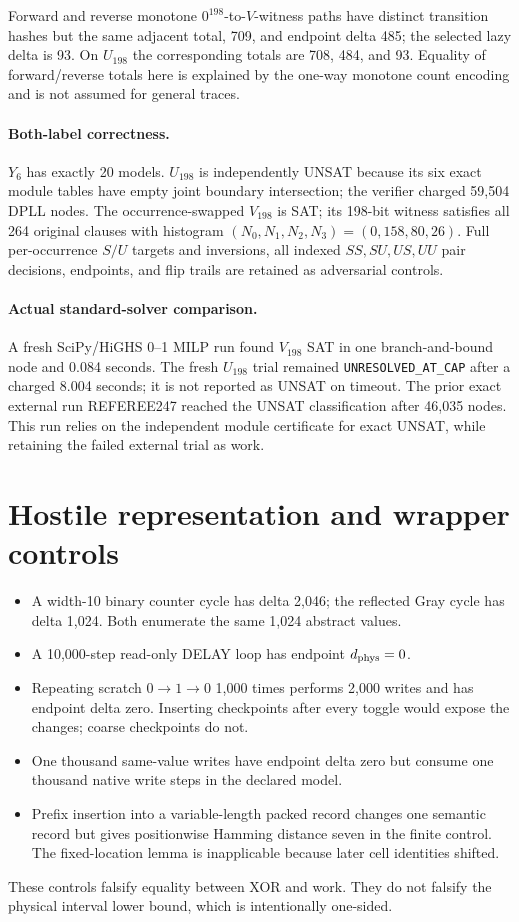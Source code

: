 \documentclass[11pt]{article}
\begin{document}
Forward and reverse monotone $0^{198}$-to-$V$-witness paths have distinct
transition hashes but the same adjacent total, 709, and endpoint delta 485;
the selected lazy delta is 93.  On $U_{198}$ the corresponding totals are 708,
484, and 93.  Equality of forward/reverse totals here is explained by the
one-way monotone count encoding and is not assumed for general traces.

\paragraph{Both-label correctness.}
$Y_6$ has exactly 20 models.  $U_{198}$ is independently UNSAT because its
six exact module tables have empty joint boundary intersection; the verifier
charged 59,504 DPLL nodes.  The occurrence-swapped $V_{198}$ is SAT; its
198-bit witness satisfies all 264 original clauses with histogram
$(N_0,N_1,N_2,N_3)=(0,158,80,26)$.  Full per-occurrence $S/U$ targets and
inversions, all indexed $SS,SU,US,UU$ pair decisions, endpoints, and flip trails
are retained as adversarial controls.

\paragraph{Actual standard-solver comparison.}
A fresh SciPy/HiGHS 0--1 MILP run found $V_{198}$ SAT in one branch-and-bound
node and 0.084 seconds.  The fresh $U_{198}$ trial remained
\texttt{UNRESOLVED\_AT\_CAP} after a charged 8.004 seconds; it is not reported
as UNSAT on timeout.  The prior exact external run REFEREE247 reached the UNSAT
classification after 46,035 nodes.  This run relies on the independent module
certificate for exact UNSAT, while retaining the failed external trial as work.

\section{Hostile representation and wrapper controls}
\begin{itemize}
\item A width-10 binary counter cycle has delta 2,046; the reflected Gray cycle
has delta 1,024.  Both enumerate the same 1,024 abstract values.
\item A 10,000-step read-only DELAY loop has endpoint $d_{\rm phys}=0$.
\item Repeating scratch $0\to1\to0$ 1,000 times performs 2,000 writes and has
endpoint delta zero.  Inserting checkpoints after every toggle would expose
the changes; coarse checkpoints do not.
\item One thousand same-value writes have endpoint delta zero but consume one
thousand native write steps in the declared model.
\item Prefix insertion into a variable-length packed record changes one
semantic record but gives positionwise Hamming distance seven in the finite
control.  The fixed-location lemma is inapplicable because later cell identities
shifted.
\end{itemize}
These controls falsify equality between XOR and work.  They do not falsify the
physical interval lower bound, which is intentionally one-sided.
\end{document}

